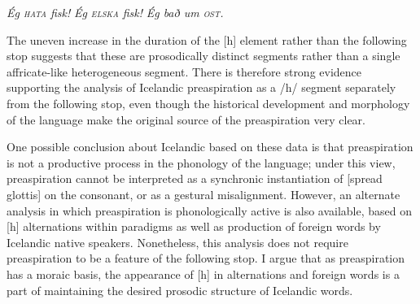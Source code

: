 \documentclass[output=paper,colorlinks,citecolor=brown]{langscibook}
\begin{document}
\ea 
\label{ex-arnason-hates-fish}
\ea \textit{Ég \textsc{hata} fisk!}  
	\sn {}
	\ex \textit{Ég \textsc{elska} fisk!}  
	\sn {}
	\ex \textit{Ég bað um \textsc{ost}.}  
	\sn {}
	\z
\ex
\label{ex-arnason-preaspiration-focus}
\ea {}  
	\sn {}
	\ex {}  
	\sn {}
	\ex {}  
	\sn {}
	\z
\z

The uneven increase in the duration of the [h] element rather than the following stop suggests that these are prosodically distinct segments rather than a single affricate-like heterogeneous segment. There is therefore strong evidence supporting the analysis of Icelandic preaspiration as a /h/ segment separately from the following stop, even though the historical development and morphology of the language make the original source of the preaspiration very clear. 

One possible conclusion about Icelandic based on these data is that preaspiration is not a productive process in the phonology of the language; under this view, preaspiration cannot be interpreted as a synchronic instantiation of [spread glottis] on the consonant, or as a gestural misalignment. However, an alternate analysis in which preaspiration is phonologically active is also available, based on [h] alternations within paradigms as well as production of foreign words by Icelandic native speakers. Nonetheless, this analysis does not require preaspiration to be a feature of the following stop. I argue that as preaspiration has a moraic basis, the appearance of [h] in alternations and foreign words is a part of maintaining the desired prosodic structure of Icelandic words. 
\end{document}
